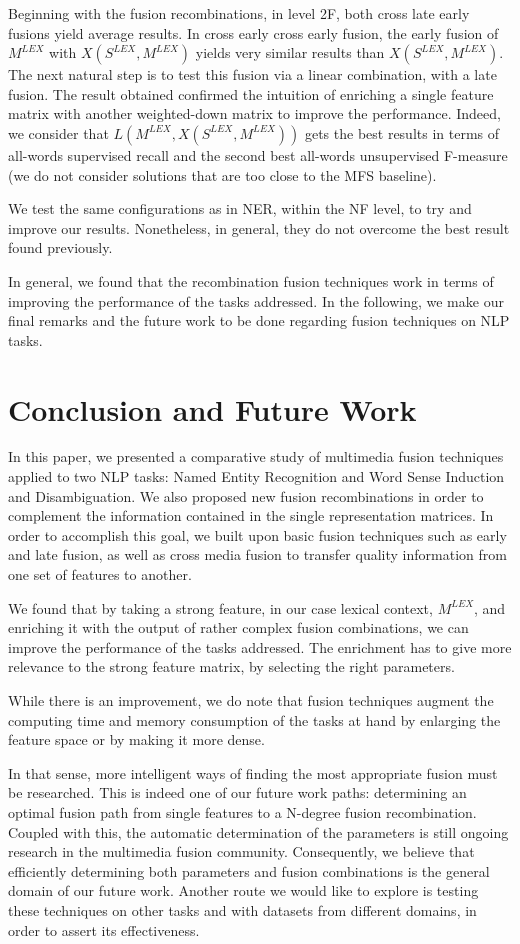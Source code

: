 \documentclass{llncs}
\newcommand\mlex{M^{\scriptscriptstyle LEX}}
\newcommand\slex{S^{\scriptscriptstyle LEX}}
\begin{document}
Beginning with the fusion recombinations, in level 2F, both cross late early fusions yield average results. In cross early cross early fusion, the early fusion of $\mlex$ with  $X(\slex, \mlex)$ yields very similar results than $X(\slex, \mlex)$. The next natural step is to test this fusion via a linear combination, with a late fusion. The result obtained confirmed the intuition of enriching a single feature matrix with another weighted-down matrix to improve the performance. Indeed, we consider that $L(M^{LEX}, X(S^{LEX}, M^{LEX}))$ gets the best results in terms of all-words supervised recall and the second best all-words unsupervised F-measure (we do not consider solutions that are too close to the MFS baseline). 

We test the same configurations as in NER, within the NF level, to try and improve our results. Nonetheless, in general, they do not overcome the best result found previously.

In general, we found that the recombination fusion techniques work in terms of improving the performance of the tasks addressed. In the following, we make our final remarks and the future work to be done regarding fusion techniques on NLP tasks.

\section{Conclusion and Future Work}
In this paper, we presented a comparative study of multimedia fusion techniques applied to two NLP tasks: Named Entity Recognition and Word Sense Induction and Disambiguation. We also proposed new fusion recombinations in order to complement the information contained in the single representation matrices. In order to accomplish this goal, we built upon basic fusion techniques such as early and late fusion, as well as cross media fusion to transfer quality information from one set of features to another. 

We found that by taking a strong feature, in our case lexical context, $\mlex$, and enriching it with the output of rather complex fusion combinations, we can improve the performance of the tasks addressed. The enrichment has to give more relevance to the strong feature matrix, by selecting the right parameters. 

While there is an improvement, we do note that fusion techniques augment the computing time and memory consumption of the tasks at hand by enlarging the feature space or by making it more dense.

In that sense, more intelligent ways of finding the most appropriate fusion must be researched. This is indeed one of our future work paths: determining an optimal fusion path from single features to a N-degree fusion recombination. Coupled with this, the automatic determination of the parameters is still ongoing research in the multimedia fusion community. Consequently, we believe that efficiently determining both parameters and fusion combinations is the general domain of our future work. Another route we would like to explore is testing these techniques on other tasks and with datasets from different domains, in order to assert its effectiveness.



\end{document}
